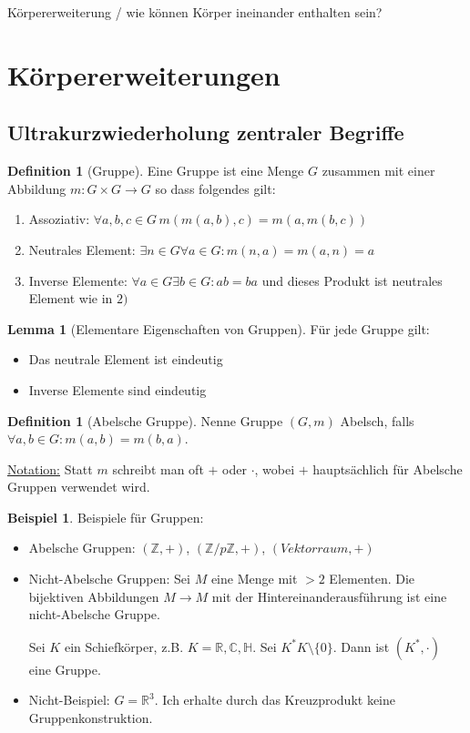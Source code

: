 \documentclass[12pt,parskip=full]{scrartcl}
\newcommand{\setZ}{\mathbb{Z}}
\newcommand{\setR}{\mathbb{R}}
\newcommand{\setC}{\mathbb{C}}
\newcommand{\setH}{\mathbb{H}}
\newcommand{\heading}{\underline}
\theoremstyle{definition}
\newtheorem{lemma}[theorem]{Lemma}
\newtheorem{definition}[theorem]{Definition}
\newtheorem{example}[theorem]{Beispiel}
\theoremstyle{remark}
\begin{document}
	Körpererweiterung / wie können Körper ineinander enthalten sein?	
	
	\section{Körpererweiterungen}
	
	\subsection{Ultrakurzwiederholung zentraler Begriffe}
	
	\begin{definition}[Gruppe]
		Eine Gruppe ist eine Menge $G$ zusammen mit einer Abbildung $m: G \times G \to G$ so dass folgendes gilt:
		\begin{enumerate}
			\item Assoziativ: $\forall a,b,c \in G \, m(m(a,b), c) = m(a, m(b,c))$
			\item Neutrales Element: $\exists n \in G \forall a \in G: m(n,a) = m(a,n) = a$
			\item Inverse Elemente: $\forall a \in G \exists b \in G: ab = ba$ und dieses Produkt ist neutrales Element wie in $2)$
		\end{enumerate}
	\end{definition}

	\begin{lemma}[Elementare Eigenschaften von Gruppen]
		Für jede Gruppe gilt:
		\begin{itemize}
			\item Das neutrale Element ist eindeutig
			\item Inverse Elemente sind eindeutig
		\end{itemize}
	\end{lemma}

	\begin{definition}[Abelsche Gruppe]
		Nenne Gruppe $(G,m)$ Abelsch, falls $\forall a,b \in G: m(a,b) = m(b,a)$.
	\end{definition}

	\heading{Notation:} Statt $m$ schreibt man oft $+$ oder $\cdot$, wobei $+$ hauptsächlich für Abelsche Gruppen verwendet wird.
	
	\begin{example}
		Beispiele für Gruppen:
		\begin{itemize}
			\item Abelsche Gruppen: $(\setZ, +)$, $(\setZ / p\setZ, +)$, $(Vektorraum, +)$
			\item Nicht-Abelsche Gruppen: Sei $M$ eine Menge mit $>2$ Elementen. Die bijektiven Abbildungen $M \to M$ mit der Hintereinanderausführung ist eine nicht-Abelsche Gruppe.
			
			Sei $K$ ein Schiefkörper, z.B. $K = \setR, \setC, \setH$. Sei $K^* K \setminus \{0\}$. Dann ist $(K^*, \cdot)$ eine Gruppe.
			\item Nicht-Beispiel: $G = \setR^3$. Ich erhalte durch das Kreuzprodukt keine Gruppenkonstruktion.
		\end{itemize}
	\end{example}
\end{document}
